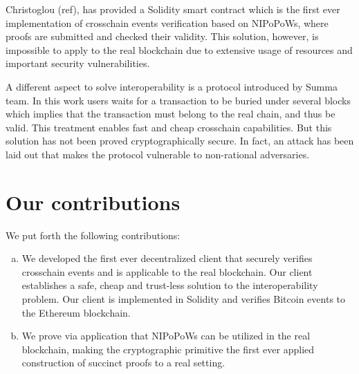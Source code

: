 Christoglou (ref), has provided a Solidity smart contract which is the first
ever implementation of crosschain events verification based on NIPoPoWs, where
proofs are submitted and checked their validity. This solution, however, is
impossible to apply to the real blockchain due to extensive usage of resources
and important security vulnerabilities.

A different aspect to solve interoperability is a protocol introduced by Summa
team. In this work users waits for a transaction to be buried under several
blocks which implies that the transaction must belong to the real chain, and
thus be valid. This treatment enables fast and cheap crosschain capabilities.
But this solution has not been proved cryptographically secure. In fact, an
attack has been laid out that makes the protocol vulnerable to non-rational
adversaries.

\section{Our contributions}


We put forth the following contributions:

\begin{enumerate}[(a)]

    \item We developed the first ever decentralized client that securely
        verifies crosschain events and is applicable to the real blockchain.
        Our client establishes a safe, cheap and trust-less solution to the
        interoperability problem. Our client is implemented in Solidity and
        verifies Bitcoin events to the Ethereum blockchain.

    \item We prove via application that NIPoPoWs can be utilized in the real
        blockchain, making the cryptographic primitive the first
        ever applied construction of succinct proofs to a real setting.

\end{enumerate}

